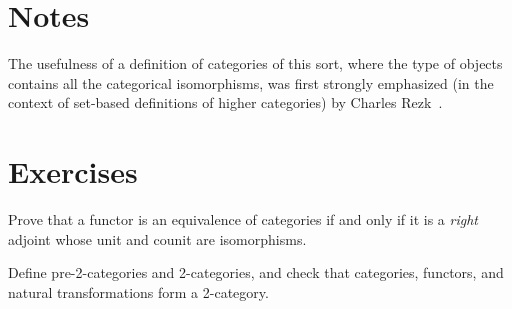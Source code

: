\section*{Notes}
\label{sec:ct:notes}

The usefulness of a definition of categories of this sort, where the type of objects contains all the categorical isomorphisms, was first strongly emphasized (in the context of set-based definitions of higher categories) by Charles Rezk~\cite{rezk01css}.

\section*{Exercises}
\label{sec:ct:exercises}

\begin{ex}
  Prove that a functor is an equivalence of categories if and only if it is a \emph{right} adjoint whose unit and counit are isomorphisms.
\end{ex}

\begin{ex}
  Define pre-2-categories and 2-categories, and check that categories, functors, and natural transformations form a 2-category.
\end{ex}


